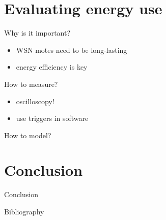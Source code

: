 \documentclass[presentation, bigger]{beamer}
\begin{document}
\section{Evaluating energy use}
\label{sec-3}

\begin{frame}[label=sec-3-1]{Why is it important?}
\begin{itemize}
\item WSN motes need to be long-lasting
\item energy efficiency is key
\end{itemize}
\end{frame}

\begin{frame}[label=sec-3-2]{How to measure?}
\begin{itemize}
\item oscilloscopy!
\item use triggers in software
\end{itemize}
\end{frame}

\begin{frame}[label=sec-3-3]{How to model?}
\end{frame}
\section{Conclusion}
\label{sec-4}
\begin{frame}[label=sec-4-1]{Conclusion}
\end{frame}
\begin{frame}[label=sec-4-2]{Bibliography}
\nocite{*}
\printbibliography
\end{frame}
\end{document}
